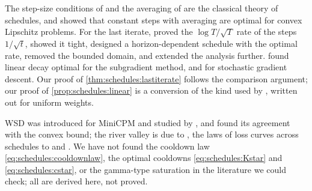 \begin{refsection}
\notesandrefs
The step-size conditions of \textcite{RobbinsMonro1951} and the averaging of \textcite{PolyakJuditsky1992} are the classical theory of schedules, and \textcite{NemirovskiEtAl2009} showed that constant steps with averaging are optimal for convex Lipschitz problems. For the last iterate, \textcite{ShamirZhang2013} proved the $\log T/\sqrt T$ rate of the steps $1/\sqrt t$, \textcite{HarveyEtAl2019} showed it tight, \textcite{JainNagarajNetrapalli2019} designed a horizon-dependent schedule with the optimal rate, \textcite{Orabona2020} removed the bounded domain, and \textcite{LiuZhou2024} extended the analysis further. \Textcite{ZamaniGlineur2025} found linear decay optimal for the subgradient method, and \textcite{DefazioEtAl2023} for stochastic gradient descent. Our proof of \cref{thm:schedules:lastiterate} follows the comparison argument; our proof of \cref{prop:schedules:linear} is a conversion of the kind used by \textcite{DefazioEtAl2023}, written out for uniform weights.

WSD was introduced for MiniCPM \parencite{HuEtAl2024} and studied by \textcite{HageleEtAl2024}, and \textcite{SchaippEtAl2025} found its agreement with the convex bound; the river valley is due to \textcite{WenEtAl2025}, the laws of loss curves across schedules to \textcite{TissueEtAl2025} and \textcite{LuoEtAl2025}. We have not found the cooldown law \eqref{eq:schedules:cooldownlaw}, the optimal cooldowns \eqref{eq:schedules:Kstar} and \eqref{eq:schedules:cstar}, or the gamma-type saturation in the literature we could check; all are derived here, not proved.


\end{refsection}
